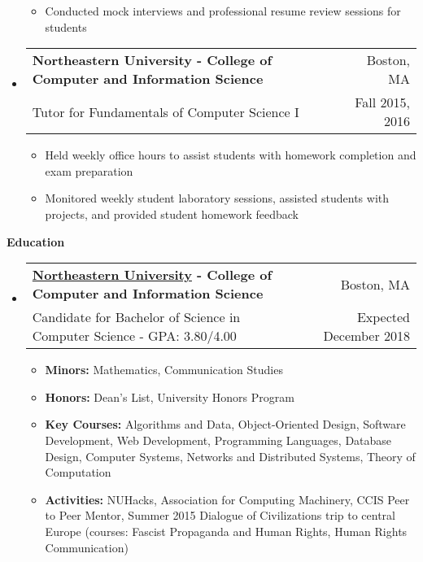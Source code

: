 \documentclass[letterpaper,10pt]{article}
\makeatletter
\newcommand{\resitem}[1]{\item #1 \vspace{-2pt}}
\newcommand{\resheading}[1]{{\large \colorbox{mygrey}{\begin{minipage}{\textwidth}{\textbf{#1 \vphantom{p\^{E}}}}\end{minipage}}}}
\newcommand{\ressubheading}[4]{
\begin{tabular*}{6.8in}{l@{\extracolsep{\fill}}r}
		\textbf{#1} & #2 \\
		\small{#3} & \small{#4} \\
\end{tabular*}\vspace{-6pt}}
\makeatother
\begin{document}
\begin{itemize}[leftmargin=*]
{\begin{itemize}
			\resitem{Conducted mock interviews and professional resume review sessions for students}
	\end{itemize}}
	\item[]
	\ressubheading{Northeastern University - \small{College of Computer and Information Science}}{Boston, MA}{Tutor for Fundamentals of Computer Science I}{Fall 2015, 2016}
	{\footnotesize
		\begin{itemize}
			\resitem{Held weekly office hours to assist students with homework completion and exam preparation}
			\resitem{Monitored weekly student laboratory sessions, assisted students with projects, and provided student homework feedback}
	\end{itemize}}
\end{itemize}

\resheading{Education}
	\begin{itemize}[leftmargin=*]
		\item[]
			\ressubheading{\href{http://www.northeastern.edu}{Northeastern University} - College of Computer and Information Science}{Boston, MA}{{Candidate for Bachelor of Science in Computer Science - }{GPA: 3.80/4.00}}{Expected December 2018}
				{ \footnotesize
				\begin{itemize}
					\resitem{\textbf{Minors:} Mathematics, Communication Studies}
					\resitem{\textbf{Honors:} Dean's List, University Honors Program}
					\resitem{\textbf{Key Courses:} Algorithms and Data, Object-Oriented Design, Software Development, Web Development, Programming Languages, Database Design, Computer Systems, Networks and Distributed Systems, Theory of Computation}
					\resitem{\textbf{Activities:} NUHacks, Association for Computing Machinery, CCIS Peer to Peer Mentor, Summer 2015 Dialogue of Civilizations trip to central Europe (courses: Fascist Propaganda and Human Rights, Human Rights Communication)}
				\end{itemize}}
	\end{itemize}
\end{document}
